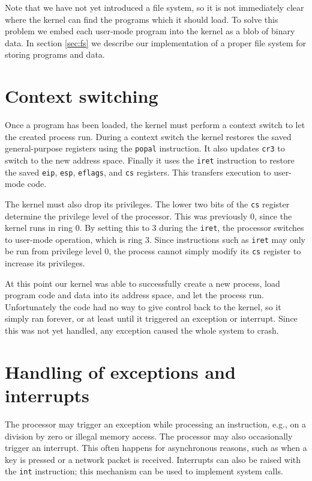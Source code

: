 \documentclass{report}
\begin{document}
Note that we have not yet introduced a file system, so it is not immediately
clear where the kernel can find the programs which it should load. To solve
this problem we embed each user-mode program into the kernel as a blob of
binary data. In section \ref{sec:fs} we describe our implementation of a
proper file system for storing programs and data.

\section{Context switching}
Once a program has been loaded, the kernel must perform a context switch to
let the created process run. During a context switch the kernel restores the
saved general-purpose registers using the \texttt{popal} instruction. It also
updates \texttt{cr3} to switch to the new address space. Finally it uses the
\texttt{iret} instruction to restore the saved \texttt{eip}, \texttt{esp},
\texttt{eflags}, and \texttt{cs} registers. This transfers execution to
user-mode code. 

The kernel must also drop its privileges. The lower two bits of the
\texttt{cs} register determine the privilege level of the processor. This was
previously 0, since the kernel runs in ring 0. By setting this to 3 during the
\texttt{iret}, the processor switches to user-mode operation, which is ring 3.
Since instructions such as \texttt{iret} may only be run from privilege level
0, the process cannot simply modify its \texttt{cs} register to increase its
privileges.

At this point our kernel was able to successfully create a new process, load
program code and data into its address space, and let the process run.
Unfortunately the code had no way to give control back to the kernel, so it
simply ran forever, or at least until it triggered an exception or interrupt.
Since this was not yet handled, any exception caused the whole system to
crash.


\section{Handling of exceptions and interrupts}
The processor may trigger an exception while processing an instruction, e.g.,
on a division by zero or illegal memory access. The processor may also
occasionally trigger an interrupt. This often happens for asynchronous
reasons, such as when a key is pressed or a network packet is received.
Interrupts can also be raised with the \texttt{int} instruction; this
mechanism can be used to implement system calls.
\end{document}
